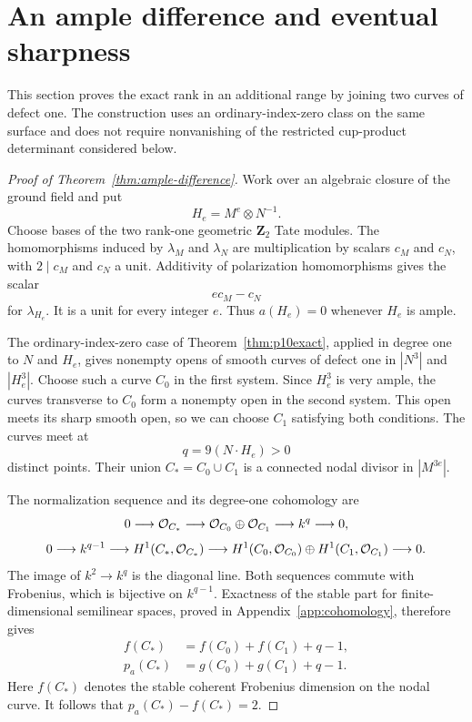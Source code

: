 \section{An ample difference and eventual sharpness}
\label{sec:ample-difference}

This section proves the exact rank in an additional range by joining two curves of defect one. The construction uses an ordinary-index-zero class on the same surface and does not require nonvanishing of the restricted cup-product determinant considered below.

\begin{proof}[Proof of Theorem~\ref{thm:ample-difference}]
Work over an algebraic closure of the ground field and put
\[
                 H_e=M^e\otimes N^{-1}.
\]
Choose bases of the two rank-one geometric $\mathbf Z_2$ Tate modules. The homomorphisms induced by $\lambda_M$ and $\lambda_N$ are multiplication by scalars $c_M$ and $c_N$, with $2\mid c_M$ and $c_N$ a unit. Additivity of polarization homomorphisms gives the scalar
\[
                         e c_M-c_N
\]
for $\lambda_{H_e}$. It is a unit for every integer $e$. Thus $a(H_e)=0$ whenever $H_e$ is ample.

The ordinary-index-zero case of Theorem~\ref{thm:p10exact}, applied in degree one to $N$ and $H_e$, gives nonempty opens of smooth curves of defect one in $|N^3|$ and $|H_e^3|$. Choose such a curve $C_0$ in the first system. Since $H_e^3$ is very ample, the curves transverse to $C_0$ form a nonempty open in the second system. This open meets its sharp smooth open, so we can choose $C_1$ satisfying both conditions. The curves meet at
\[
                      q=9(N\cdot H_e)>0
\]
distinct points. Their union $C_*=C_0\cup C_1$ is a connected nodal divisor in $|M^{3e}|$.

The normalization sequence and its degree-one cohomology are
\[
 0\longrightarrow\mathcal O_{C_*}\longrightarrow
 \mathcal O_{C_0}\oplus\mathcal O_{C_1}\longrightarrow k^q\longrightarrow0,
\]
\[
 0\longrightarrow k^{q-1}\longrightarrow H^1(C_*,\mathcal O_{C_*})
 \longrightarrow H^1(C_0,\mathcal O_{C_0})\oplus H^1(C_1,\mathcal O_{C_1})
 \longrightarrow0.
\]
The image of $k^2\to k^q$ is the diagonal line. Both sequences commute with Frobenius, which is bijective on $k^{q-1}$. Exactness of the stable part for finite-dimensional semilinear spaces, proved in Appendix~\ref{app:cohomology}, therefore gives
\[
\begin{split}
 f(C_*)&=f(C_0)+f(C_1)+q-1,\\
 p_a(C_*)&=g(C_0)+g(C_1)+q-1.
\end{split}
\]
Here $f(C_*)$ denotes the stable coherent Frobenius dimension on the nodal curve. It follows that $p_a(C_*)-f(C_*)=2$.


\end{proof}
